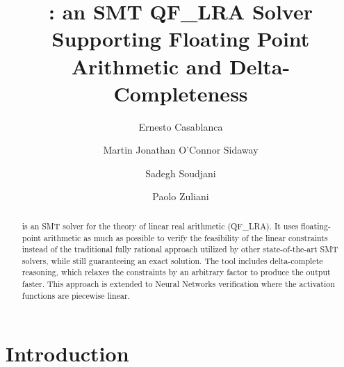 \documentclass[runningheads]{llncs}
\begin{document}
\title{\dlinear: an SMT QF\_LRA Solver Supporting Floating Point Arithmetic and Delta-Completeness}
\titlerunning{\dlinear}

\author{Ernesto Casablanca
    \and
    Martin Jonathan O'Connor Sidaway
    \and
    Sadegh Soudjani
    \and
    Paolo Zuliani
}



\maketitle

\begin{abstract}
    \dlinear is an SMT solver for the theory of linear real arithmetic (QF\_LRA).
    It uses floating-point arithmetic as much as possible to verify the feasibility of the linear constraints instead of the traditional fully rational approach utilized by other state-of-the-art SMT solvers,
    while still guaranteeing an exact solution.
    The tool includes delta-complete reasoning, which relaxes the constraints by an arbitrary factor to produce the output faster.
    This approach is extended to Neural Networks verification where the activation functions are piecewise linear.

\end{abstract}

\section{Introduction}
\end{document}
